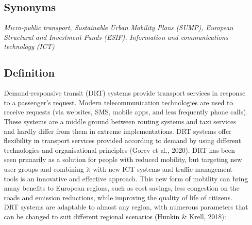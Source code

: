 \documentclass[
]{book}
\begin{document}
\hypertarget{synonyms-20}{%
\subsection*{Synonyms}\label{synonyms-20}}

\emph{Micro-public transport, Sustainable Urban Mobility Plans (SUMP), European Structural and Investment Funds (ESIF), Information and communications technology (ICT)}

\hypertarget{definition-23}{%
\subsection*{Definition}\label{definition-23}}

Demand-responsive transit (DRT) systems provide transport services in response to a passenger's request. Modern telecommunication technologies are used to receive requests (via websites, SMS, mobile apps, and less frequently phone calls). These systems are a middle ground between routing systems and taxi services and hardly differ from them in extreme implementations. DRT systems offer flexibility in transport services provided according to demand by using different technologies and organisational principles (Gorev et al., 2020).
DRT has been seen primarily as a solution for people with reduced mobility, but targeting new user groups and combining it with new ICT systems and traffic management tools is an innovative and effective approach. This new form of mobility can bring many benefits to European regions, such as cost savings, less congestion on the roads and emission reductions, while improving the quality of life of citizens. DRT systems are adaptable to almost any region, with numerous parameters that can be changed to suit different regional scenarios (Hunkin \& Krell, 2018):
\end{document}
